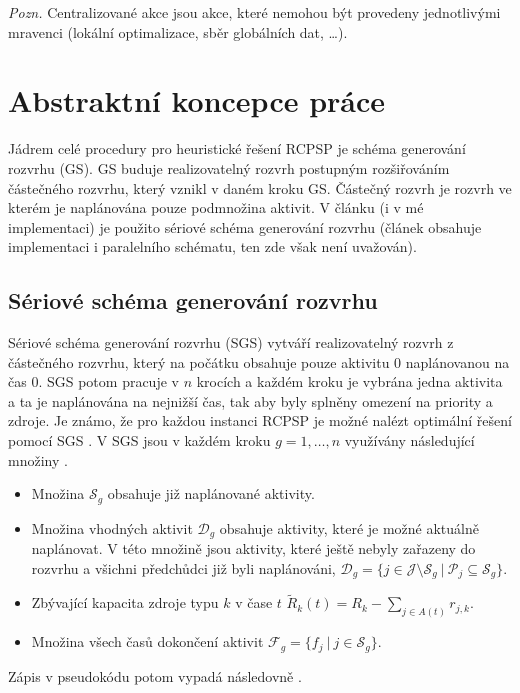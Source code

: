 \documentclass[a4paper,12pt]{article}
\begin{document}
\medskip
\emph{Pozn.} Centralizované akce jsou akce, které nemohou být provedeny jednotlivými mravenci (lokální optimalizace, sběr globálních dat, \dots).

\section{Abstraktní koncepce práce}

Jádrem celé procedury pro heuristické řešení RCPSP je schéma generování rozvrhu (GS). GS buduje realizovatelný
rozvrh postupným rozšiřováním částečného rozvrhu, který vznikl v daném kroku GS. Částečný rozvrh je rozvrh ve kterém je 
naplánována pouze podmnožina aktivit. V článku \cite{Merkle00antcolony} (i v mé implementaci)
je použito sériové schéma generování rozvrhu (článek \cite{1027745} obsahuje implementaci i paralelního schématu, ten
zde však není uvažován).

\subsection{Sériové schéma generování rozvrhu}
Sériové schéma generování rozvrhu (SGS) vytváří realizovatelný rozvrh z částečného rozvrhu, který na počátku obsahuje pouze aktivitu $0$ 
naplánovanou na čas $0$. SGS potom pracuje v $n$ krocích a každém kroku je vybrána jedna aktivita a ta je 
naplánována na nejnižší čas, tak aby byly splněny omezení na priority a zdroje.
Je známo, že pro každou instanci RCPSP je možné nalézt optimální řešení pomocí SGS \cite{Kolisch1999}. V SGS jsou v každém kroku $g = 1,\dots,n$ využívány 
následující množiny \cite{Kolisch1999}. 
\begin{itemize}
 \item Množina $\mathcal{S}_g$ obsahuje již naplánované aktivity.
 \item Množina vhodných aktivit $\mathcal{D}_g$ obsahuje aktivity, které je možné aktuálně naplánovat. V této množině
  jsou aktivity, které ještě nebyly zařazeny do rozvrhu a všichni předchůdci již byli naplánováni, 
    $\mathcal{D}_g = \{ j\in\mathcal{J}\setminus\mathcal{S}_g\ |\ \mathcal{P}_j\subseteq \mathcal{S}_g \}$.
 \item Zbývající kapacita zdroje typu $k$ v čase $t$ $\tilde{R}_k(t) = R_k - \sum_{j\in A(t)} r_{j,k}$.
 \item Množina všech časů dokončení aktivit $\mathcal{F}_g = \{f_j\ |\ j \in\mathcal{S}_g\}$.
\end{itemize}
Zápis v pseudokódu potom vypadá následovně \cite{Kolisch1999, 1027745}.
\end{document}
